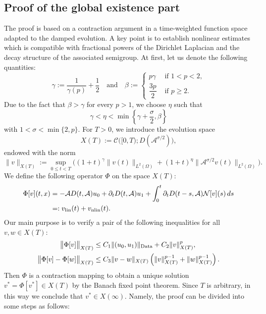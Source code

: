 \documentclass[a4paper,11pt]{article} %
\theoremstyle{remark}
\theoremstyle{definition}
\numberwithin{equation}{section}
\begin{document}
\subsection{Proof of the global existence part}\label{Proof.Sec}
The proof is based on a contraction argument in a time-weighted function space adapted to the damped evolution.
A key point is to establish nonlinear estimates which is compatible with fractional powers of the Dirichlet Laplacian and the decay structure of the associated semigroup. At first, let us denote the following quantities:
\[
\gamma:=\frac1{\gamma(p)}+\frac12 \quad\text{and}\quad
\beta:=
\begin{cases}
p\gamma &\text{ if } 1<p<2,\\[1mm]
\dfrac{3p}{2} &\text{ if } p\ge2.
\end{cases}
\]
Due to the fact that \(\beta>\gamma\) for every \(p>1\), we choose \(\eta\) such that
\[
\gamma<\eta<\min\left\{\gamma+\frac{\sigma}{2},\beta\right\}
\]
with $1<\sigma<\min\{2,p\}$. For $T>0$, we introduce the evolution space
\[
X(T):= \mathcal{C}\Big([0,T);D(\mathcal{A}^{\sigma/2})\Big),
\]
endowed with the norm
\[
\|v\|_{X(T)}
:=
\sup_{0\le t<T}
\Big(
(1+t)^\gamma\|v(t)\|_{L^2(\Omega)}
+
(1+t)^\eta\|\mathcal{A}^{\sigma/2}v(t)\|_{L^2(\Omega)}
\Big).
\]
We define the following operator $\Phi$ on the space $X(T)$:
\begin{align*}
   \Phi[v](t,x) &= -\mathcal{A}D(t,\mathcal{A})u_0 + \partial_tD(t,\mathcal{A})u_1 + \int_0^t \partial_tD(t- s,\mathcal{A}) \mathcal{N}[v](s)\,ds \\
    &= : v_{\rm lin}(t)+v_{\rm nlin}(t).
\end{align*}
Our main purpose is to verify a pair of the following inequalities for all $v, w \in X(T)$:
    \begin{align}
        \big\|\Phi[v]\big\|_{X(T)} &\leq C_1 \|(u_0, u_1)\|_{\rm Data} + C_2\|v\|_{X(T)}^p,  \label{eq:self-final} \\
        \big\|\Phi[v]-\Phi[w]\big\|_{X(T)} &\leq C_3 \|v-w\|_{X(T)}\left(\|v\|_{X(T)}^{p-1}+\|w\|_{X(T)}^{p-1}\right) \label{eq:contract-final}.
    \end{align}
Then $\Phi$ is a contraction mapping to obtain a unique solution $v^* = \Phi[v^*] \in X(T)$ by the Banach fixed point theorem. Since $T$ is arbitrary, in this way we conclude that $v^* \in X(\infty)$. Namely, the proof can be divided into some steps as follows: \medskip
\end{document}
